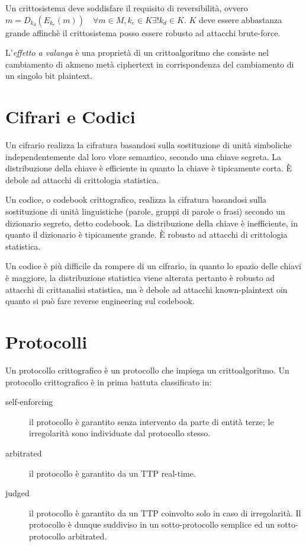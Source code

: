 Un crittosistema deve soddisfare il requisito di reversibilità, ovvero
$m=D_{k_{d}}(E_{k_{e}}(m))\quad \forall m\in M, k_{e}\in K \exists! k_{d}\in K$.
$K$ deve essere abbastanza grande affinchè il crittosistema posso essere robusto ad attacchi brute-force.

L'\textit{effetto a valanga} è una proprietà di un crittoalgoritmo che consiste nel cambiamento di akmeno metà ciphertext in corrispondenza del cambiamento di un singolo bit plaintext.

\section{Cifrari e Codici}
Un cifrario realizza la cifratura basandosi sulla sostituzione di unità simboliche independentemente dal loro vlore semantico, secondo una chiave segreta. La distribuzione della chiave è efficiente in quanto la chiave è tipicamente corta. È debole ad attacchi di crittologia statistica.

Un codice, o codebook crittografico, realizza la cifratura basandosi sulla sostituzione di unità linguistiche (parole, gruppi di parole o frasi) secondo un dizionario segreto, detto codebook. La distribuzione della chiave è inefficiente, in quanto il dizionario è tipicamente grande. È robusto ad attacchi di crittologia statistica.

Un codice è più difficile da rompere di un cifrario, in quanto lo spazio delle chiavi è maggiore, la distribuzione statistica viene alterata pertanto è robusto ad attacchi di crittanalisi statistica, ma è debole ad attacchi known-plaintext oin quanto si può fare reverse engineering sul codebook.


\section{Protocolli}
Un protocollo crittografico è un protocollo che impiega un crittoalgoritmo.
Un protocollo crittografico è in prima battuta classificato in:
\begin{description}
  \item[self-enforcing] il protocollo è garantito senza intervento da parte di entità terze; le irregolarità sono individuate dal protocollo stesso.
  \item[arbitrated] il protocollo è garantito da un TTP real-time.
  \item[judged] il protocollo è garantito da un TTP coinvolto solo in caso di irregolarità. Il protocollo è dunque suddiviso in un sotto-protocollo semplice ed un sotto-protocollo arbitrated.
\end{description}
